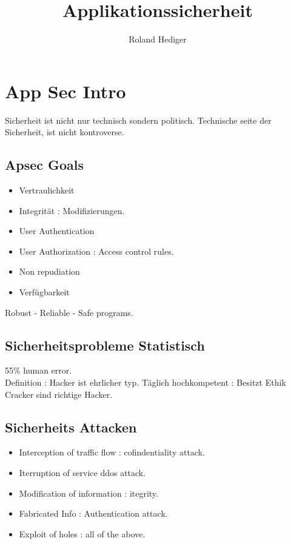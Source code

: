 \documentclass[a4paper,10pt]{scrreprt}
\begin{document}
\begin{titlepage}
\title{Applikationssicherheit}
\author{Roland Hediger}
\end{titlepage}
\maketitle
\newpage

\pagestyle{fancy}
\section{App Sec Intro}
Sicherheit ist nicht nur technisch sondern politisch. Technische seite der Sicherheit, ist nicht kontroverse.\\

\subsection{Apsec Goals}
\begin{itemize}
 \item Vertraulichkeit
 \item Integrität : Modifizierungen.
 \item User Authentication
 \item User Authorization : Access control rules. 
 \item Non repudiation
 \item Verfügbarkeit
\end{itemize}
Robust - Reliable - Safe programs.

\subsection{Sicherheitsprobleme Statistisch}
55\% human error. \\
Definition : Hacker ist ehrlicher typ. Täglich hochkompetent : Besitzt Ethik
Cracker sind richtige Hacker. \\

\subsection{Sicherheits Attacken}
\begin{itemize}
 \item Interception of traffic flow : cofindentiality attack.
 \item Iterruption of service ddos attack.
 \item Modification of information : itegrity.
 \item Fabricated Info : Authentication attack.
 \item Exploit of holes : all of the above.
 
\end{itemize}
\end{document}
